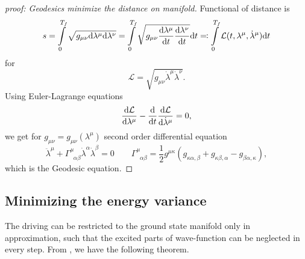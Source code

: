 \begin{proof}[proof: Geodesics minimize the distance on manifold]
    Functional of distance is
    \begin{equation}
        s=\int\limits_0^{T_f} \sqrt{g_{\mu\nu}\mathrm{d}\lambda^\mu\mathrm{d}\lambda^\nu}=\int\limits_0^{T_f} \sqrt{g_{\mu\nu}\frac{\mathrm{d} \lambda^\mu}{\mathrm{d} t}\frac{\mathrm{d} \lambda^\nu}{\mathrm{d} t}}\mathrm{d} t \eqqcolon \int\limits_0^{T_f} \mathcal{L}(t,\lambda^\mu,\dot\lambda^\mu)\mathrm{d} t
    \end{equation}
    for 
    \begin{equation}
        \mathcal{L}=\sqrt{g_{\mu\nu}\dot\lambda^\mu\dot\lambda^\nu}.
    \end{equation}
    Using Euler-Lagrange equations 
    \begin{equation}
        \frac{\mathrm{d} \mathcal{L}}{\mathrm{d} \lambda^\mu}-\frac{\mathrm{d} }{\mathrm{d} t}\frac{\mathrm{d} \mathcal{L}}{\mathrm{d} \dot\lambda^\mu}=0,
    \end{equation}
    we get for $g_{\mu\nu}=g_{\mu\nu}(\lambda^\mu)$ second order differential equation
    \begin{equation}
        \ddot\lambda^\mu+\Gamma^\mu_{\;\;\alpha\beta}\dot\lambda^\alpha\dot\lambda^\beta=0\qquad \Gamma^\mu_{\;\;\alpha\beta}=\frac{1}{2}g^{\mu\kappa}\left(g_{\kappa\alpha,\beta}+g_{\kappa\beta,\alpha}-g_{\beta\alpha,\kappa}\right),
        \label{eq:geodesicEquaiton}
    \end{equation}
    which is the Geodesic equation.
\end{proof}











\subsection{Minimizing the energy variance}
The driving can be restricted to the ground state manifold only in approximation, such that the excited parts of wave-function can be neglected in every step. From \cite{Bukov2019}, we have the following theorem.

